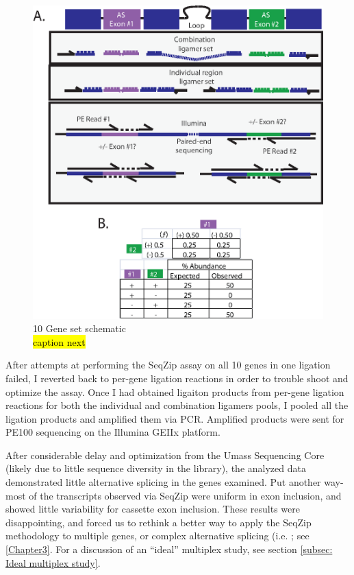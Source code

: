   \begin{figure}[htbp] %
    \centering 
    \includegraphics{Figures/Chapter2/10GeneSetSchematic.eps}
    \caption[10 Gene Set schematic]
    {
      10 Gene set schematic\\
      \hl{caption next}
	    }
    \label{fig:Multiplex Study Design}
  	\end{figure}

  After attempts at performing the SeqZip assay on all 10 genes in one ligation failed, I reverted back to per-gene ligation reactions in order to trouble shoot and optimize the assay. Once I had obtained ligaiton products from per-gene ligation reactions for both the individual and combination ligamers pools, I pooled all the ligation products and amplified them via PCR. Amplified products were sent for PE100 sequencing on the Illumina GEIIx platform. 

  After considerable delay and optimization from the Umass Sequencing Core (likely due to little sequence diversity in the library), the analyzed data demonstrated little alternative splicing in the genes examined. Put another way- most of the transcripts observed via SeqZip were uniform in exon inclusion, and showed little variability for cassette exon inclusion. These results were disappointing, and forced us to rethink a better way to apply the SeqZip methodology to multiple genes, or complex alternative splicing (i.e. \dscam{}; see \ref{Chapter3}. For a discussion of an ``ideal'' multiplex study, see section \ref{subsec: Ideal multiplex study}.

